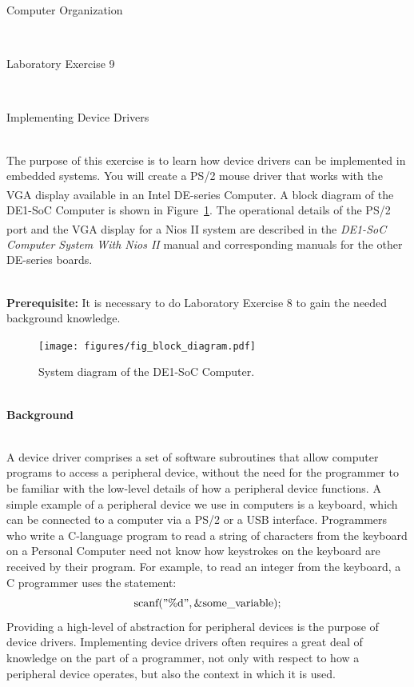 \documentclass[epsfig,10pt,fullpage]{article}
\newcommand{\LabNum}{9}
\begin{document}
\centerline{\huge Computer Organization}
~\\
\centerline{\huge Laboratory Exercise \LabNum}
~\\
\centerline{\large Implementing Device Drivers}
~\\

The purpose of this exercise is to learn how device drivers can be implemented in embedded systems. You will create a PS/2 mouse
driver that works with the VGA display available in an Intel\textsuperscript{\textregistered} DE-series Computer. A block diagram of the DE1-SoC Computer is shown in Figure~\ref{fig:sys_diagram}. The operational details of the PS/2 port and the VGA display for a Nios\textsuperscript{\textregistered} II system are described in the {\it DE1-SoC Computer System With Nios II} manual and corresponding manuals for the other DE-series boards.

~\\
\noindent
{\bf Prerequisite:} It is necessary to do Laboratory Exercise 8 to gain the needed background knowledge. 

\begin{figure}[H]
	\centering
	\texttt{[image: figures/fig\_block\_diagram.pdf]}
	\caption{System diagram of the DE1-SoC Computer.}
	\label{fig:sys_diagram}
\end{figure}

~\\
\noindent
{\bf Background}

~\\
\noindent
A device driver comprises a set of software subroutines that allow computer programs to access a peripheral device, without the need for the programmer to be familiar with the low-level details of how a peripheral device functions. A simple example of a peripheral device we use in computers is a keyboard, which can be connected to a computer via a PS/2 or a USB interface. Programmers who write a C-language program to read a string of characters from the keyboard on a Personal Computer need not know how keystrokes on the keyboard are received by their program. For example, to read an integer from the keyboard, a C programmer uses the statement:
$$
{\rm scanf("\%d", \&some\_variable);}
$$
\noindent
Providing a high-level of abstraction for peripheral devices is the purpose of device drivers. Implementing device drivers often requires a great deal of knowledge on the part of a programmer, not only with respect to how a peripheral device operates, but also the context in which it is used.
\end{document}
